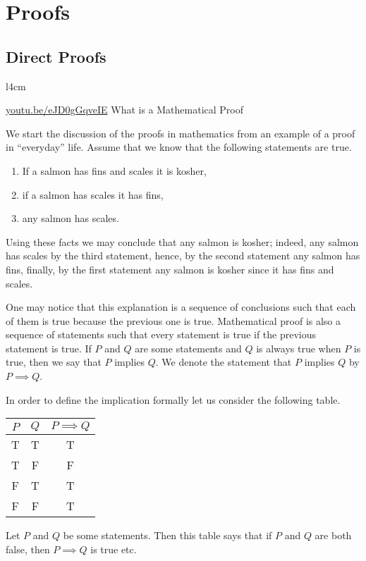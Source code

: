 \chapter{Proofs}
\section{Direct Proofs}
\begin{wrapfigure}{l}{4cm}
  \begin{center}
    \vskip -0.5cm
    \vskip 0.25cm
    \href{https://youtu.be/eJD0gGqveIE}{youtu.be/eJD0gGqveIE}
    {\footnotesize What is a Mathematical Proof}
  \end{center}
  \vskip -1cm
\end{wrapfigure}
We start the discussion of the proofs in mathematics from an example of a proof
in ``everyday'' life. Assume that we know that the following statements are
true.
\begin{enumerate}
  \item If a salmon has fins and scales it is kosher,
  \item if a salmon has scales it has fins,
  \item any salmon has scales.
\end{enumerate}
Using these facts we may conclude that any salmon is kosher; indeed, any salmon
has scales by the third statement, hence, by the second statement any salmon has
fins, finally, by the first statement any salmon is kosher since it has fins and
scales.

One may notice that this explanation is a sequence of conclusions such that
each of them is true because the previous one is true.
Mathematical proof is also a sequence of statements such that every statement
is true if the previous statement is true. If $P$ and $Q$ are some statements
and $Q$ is always true when $P$ is true, then we say that $P$ implies $Q$.
We denote the statement that $P$ implies $Q$ by $P \implies Q$.

In order to define the implication formally let us consider the following table.
\begin{center}
  \begin{tabular}{ c | c | c }
    $P$ & $Q$ & $P \implies Q$ \\ \hline
    T   & T   & T \\
    T   & F   & F \\
    F   & T   & T \\
    F   & F   & T \\
  \end{tabular}
\end{center}
Let $P$ and $Q$ be some statements. Then this table says that if $P$ and $Q$
are both false, then $P \implies Q$ is true etc.

